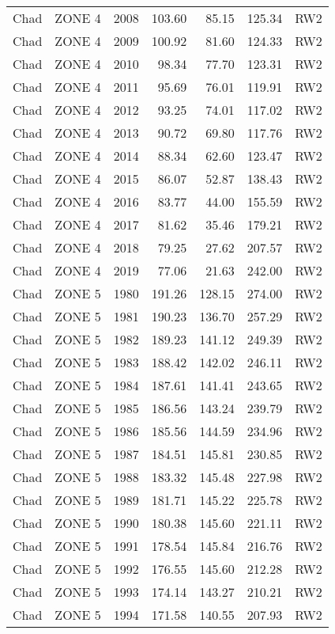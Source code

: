 \begin{longtable}{lllrrrl}
  Chad & ZONE 4 & 2008 & 103.60 & 85.15 & 125.34 & RW2 \\ 
  Chad & ZONE 4 & 2009 & 100.92 & 81.60 & 124.33 & RW2 \\ 
  Chad & ZONE 4 & 2010 & 98.34 & 77.70 & 123.31 & RW2 \\ 
  Chad & ZONE 4 & 2011 & 95.69 & 76.01 & 119.91 & RW2 \\ 
  Chad & ZONE 4 & 2012 & 93.25 & 74.01 & 117.02 & RW2 \\ 
  Chad & ZONE 4 & 2013 & 90.72 & 69.80 & 117.76 & RW2 \\ 
  Chad & ZONE 4 & 2014 & 88.34 & 62.60 & 123.47 & RW2 \\ 
  Chad & ZONE 4 & 2015 & 86.07 & 52.87 & 138.43 & RW2 \\ 
  Chad & ZONE 4 & 2016 & 83.77 & 44.00 & 155.59 & RW2 \\ 
  Chad & ZONE 4 & 2017 & 81.62 & 35.46 & 179.21 & RW2 \\ 
  Chad & ZONE 4 & 2018 & 79.25 & 27.62 & 207.57 & RW2 \\ 
  Chad & ZONE 4 & 2019 & 77.06 & 21.63 & 242.00 & RW2 \\ 
  Chad & ZONE 5 & 1980 & 191.26 & 128.15 & 274.00 & RW2 \\ 
  Chad & ZONE 5 & 1981 & 190.23 & 136.70 & 257.29 & RW2 \\ 
  Chad & ZONE 5 & 1982 & 189.23 & 141.12 & 249.39 & RW2 \\ 
  Chad & ZONE 5 & 1983 & 188.42 & 142.02 & 246.11 & RW2 \\ 
  Chad & ZONE 5 & 1984 & 187.61 & 141.41 & 243.65 & RW2 \\ 
  Chad & ZONE 5 & 1985 & 186.56 & 143.24 & 239.79 & RW2 \\ 
  Chad & ZONE 5 & 1986 & 185.56 & 144.59 & 234.96 & RW2 \\ 
  Chad & ZONE 5 & 1987 & 184.51 & 145.81 & 230.85 & RW2 \\ 
  Chad & ZONE 5 & 1988 & 183.32 & 145.48 & 227.98 & RW2 \\ 
  Chad & ZONE 5 & 1989 & 181.71 & 145.22 & 225.78 & RW2 \\ 
  Chad & ZONE 5 & 1990 & 180.38 & 145.60 & 221.11 & RW2 \\ 
  Chad & ZONE 5 & 1991 & 178.54 & 145.84 & 216.76 & RW2 \\ 
  Chad & ZONE 5 & 1992 & 176.55 & 145.60 & 212.28 & RW2 \\ 
  Chad & ZONE 5 & 1993 & 174.14 & 143.27 & 210.21 & RW2 \\ 
  Chad & ZONE 5 & 1994 & 171.58 & 140.55 & 207.93 & RW2 \\ 

\end{longtable}
